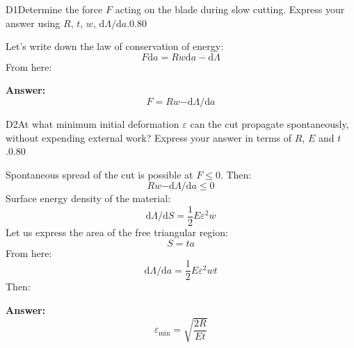 \documentclass[11pt,a4paper]{article}
\begin{document}
\begin{solcard}{D1}{Determine the force $F$ acting on the blade during slow cutting. Express your answer using $R$, $t$, $w$, $\mathrm d\Lambda/\mathrm da$.}{0.80}

Let's write down the law of conservation of energy: \[F\mathrm da=Rw\mathrm da-\mathrm d\Lambda\]From here:

\par\smallskip\noindent\textbf{Answer:} \[F\mathrm =Rw\mathrm -\mathrm d\Lambda/\mathrm da\]
\end{solcard}

\begin{solcard}{D2}{At what minimum initial deformation $\varepsilon$ can the cut propagate spontaneously, without expending external work? Express your answer in terms of $R$, $E$ and $t$.}{0.80}

Spontaneous spread of the cut is possible at $F\le 0$. Then: \[Rw\mathrm -\mathrm d\Lambda/\mathrm da\le 0\]Surface energy density of the material: \[\mathrm d\Lambda/\mathrm dS=\dfrac{1}{2}E\varepsilon^2w\]Let us express the area of the free triangular region: \[S=ta\]From here: \[\mathrm d\Lambda/\mathrm da=\dfrac{1}{2}E\varepsilon^2wt\]Then:

\par\smallskip\noindent\textbf{Answer:} \[\varepsilon_{\min}=\sqrt{\dfrac{2R}{E t}}\]
\end{solcard}
\end{document}
